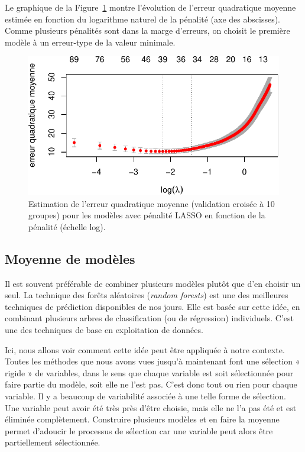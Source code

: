 \documentclass[
  11pt,
  letterpaper,
]{scrbook}
\theoremstyle{definition}
\theoremstyle{remark}
\begin{document}
Le graphique de la Figure~\ref{fig-lassopath} montre l'évolution de
l'erreur quadratique moyenne estimée en fonction du logarithme naturel
de la pénalité (axe des abscisses). Comme plusieurs pénalités sont dans
la marge d'erreurs, on choisit le première modèle à un erreur-type de la
valeur minimale.

\begin{figure}[ht!]

{\centering \includegraphics[width=1\textwidth,height=\textheight]{./04-selectionmodeles_files/figure-pdf/fig-lassopath-1.pdf}

}

\caption{\label{fig-lassopath}Estimation de l'erreur quadratique moyenne
(validation croisée à 10 groupes) pour les modèles avec pénalité LASSO
en fonction de la pénalité (échelle log).}

\end{figure}

\hypertarget{moyenne-de-moduxe8les}{%
\subsection{Moyenne de modèles}\label{moyenne-de-moduxe8les}}

Il est souvent préférable de combiner plusieurs modèles plutôt que d'en
choisir un seul. La technique des forêts aléatoires (\emph{random
forests}) est une des meilleures techniques de prédiction disponibles de
nos jours. Elle est basée sur cette idée, en combinant plusieurs arbres
de classification (ou de régression) individuels. C'est une des
techniques de base en exploitation de données.

Ici, nous allons voir comment cette idée peut être appliquée à notre
contexte. Toutes les méthodes que nous avons vues jusqu'à maintenant
font une sélection « rigide » de variables, dans le sens que chaque
variable est soit sélectionnée pour faire partie du modèle, soit elle ne
l'est pas. C'est donc tout ou rien pour chaque variable. Il y a beaucoup
de variabilité associée à une telle forme de sélection. Une variable
peut avoir été très près d'être choisie, mais elle ne l'a pas été et est
éliminée complètement. Construire plusieurs modèles et en faire la
moyenne permet d'adoucir le processus de sélection car une variable peut
alors être partiellement sélectionnée.
\end{document}
